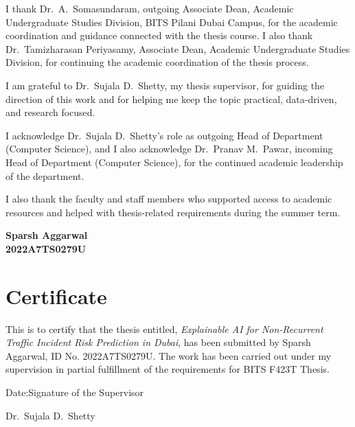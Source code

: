 \documentclass[12pt,a4paper]{report}
\newcommand{\thesistitle}{Explainable AI for Non-Recurrent Traffic Incident Risk Prediction in Dubai}
\newcommand{\studentname}{Sparsh Aggarwal}
\newcommand{\studentid}{2022A7TS0279U}
\newcommand{\supervisor}{Dr.\ Sujala D.\ Shetty}
\newcommand{\outgoingassociatedean}{Dr.\ A.\ Somasundaram}
\newcommand{\incomingassociatedean}{Dr.\ Tamizharasan Periyasamy}
\newcommand{\incominghod}{Dr.\ Pranav M.\ Pawar}
\begin{document}
I thank \outgoingassociatedean, outgoing Associate Dean, Academic Undergraduate Studies Division, BITS Pilani Dubai Campus, for the academic coordination and guidance connected with the thesis course. I also thank \incomingassociatedean, Associate Dean, Academic Undergraduate Studies Division, for continuing the academic coordination of the thesis process.

I am grateful to \supervisor, my thesis supervisor, for guiding the direction of this work and for helping me keep the topic practical, data-driven, and research focused.

I acknowledge Dr.\ Sujala D.\ Shetty's role as outgoing Head of Department (Computer Science), and I also acknowledge \incominghod, incoming Head of Department (Computer Science), for the continued academic leadership of the department.

I also thank the faculty and staff members who supported access to academic resources and helped with thesis-related requirements during the summer term.

\vspace{1cm}
\noindent \textbf{\studentname}\\
\textbf{\studentid}

\chapter*{Certificate}
This is to certify that the thesis entitled, \textit{\thesistitle}, has been submitted by \studentname, ID No. \studentid. The work has been carried out under my supervision in partial fulfillment of the requirements for BITS F423T Thesis.

\vspace{2cm}
\noindent Date:\hfill Signature of the Supervisor

\vspace{1.2cm}
\noindent \hfill \supervisor
\end{document}
